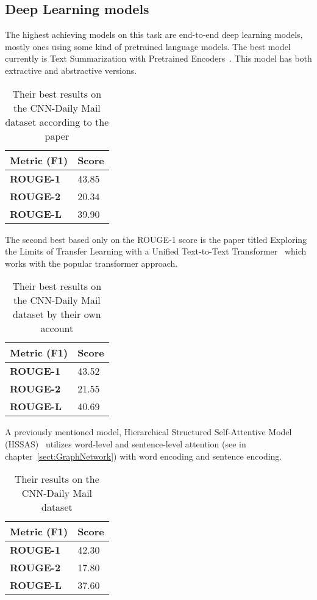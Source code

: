 \subsection{Deep Learning models}

The highest achieving models on this task are end-to-end deep learning models, mostly ones using some kind of pretrained language models.
The best model currently is Text Summarization with Pretrained Encoders~\cite{BERTsum}. This model has both extractive and abstractive versions.

\begin{table}[!ht]
	\centering
	\begin{tabular}{| l | l |}
		\hline 
		\textbf{Metric (F1)}&\textbf{Score} \\ \hline \hline
		\textbf{ROUGE-1}&43.85 \\ \hline
		\textbf{ROUGE-2}&20.34 \\ \hline
		\textbf{ROUGE-L}&39.90 \\ \hline
	\end{tabular}
	\caption{Their best results on the CNN-Daily Mail dataset according to the paper}
\end{table}
\FloatBarrier

The second best based only on the ROUGE-1 score is the paper titled Exploring the Limits of Transfer Learning with a Unified Text-to-Text Transformer~\cite{TransferSum} which works with the popular transformer approach.

\begin{table}[!ht]
	\centering
	\begin{tabular}{| l | l |}
		\hline 
		\textbf{Metric (F1)}&\textbf{Score} \\ \hline \hline
		\textbf{ROUGE-1}&43.52 \\ \hline
		\textbf{ROUGE-2}&21.55 \\ \hline
		\textbf{ROUGE-L}&40.69 \\ \hline
	\end{tabular}
	\caption{Their best results on the CNN-Daily Mail dataset by their own account}
\end{table}
\FloatBarrier

A previously mentioned model, Hierarchical Structured Self-Attentive Model (HSSAS)~\cite{HSSAS} utilizes word-level and sentence-level attention (see in chapter~\ref{sect:GraphNetwork}) with word encoding and sentence encoding.
\begin{table}[!ht]
	\centering
	\begin{tabular}{| l | l |}
		\hline 
		\textbf{Metric (F1)}&\textbf{Score} \\ \hline \hline
		\textbf{ROUGE-1}&42.30 \\ \hline
		\textbf{ROUGE-2}&17.80 \\ \hline
		\textbf{ROUGE-L}&37.60 \\ \hline
	\end{tabular}
	\caption{Their results on the CNN-Daily Mail dataset}
\end{table}